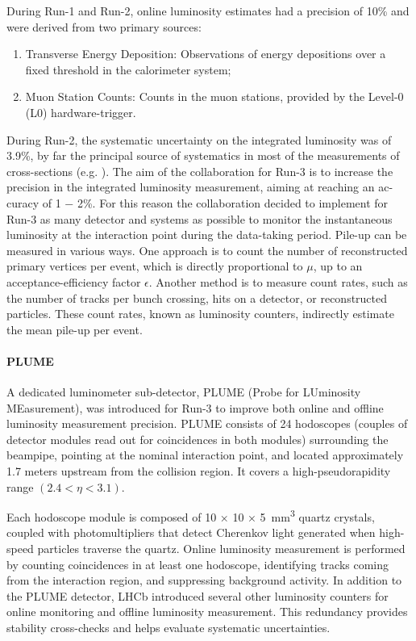 During Run-1 and Run-2, online luminosity estimates had a precision of 10\% and were derived from two primary sources: 
\begin{enumerate}
    \item Transverse Energy Deposition: Observations of energy depositions over a fixed threshold in the calorimeter system;
    \item Muon Station Counts: Counts in the muon stations, provided by the Level-0 (L0) hardware-trigger.
\end{enumerate}
During Run-2, the systematic uncertainty on the integrated luminosity was of 3.9\%, by far the principal source of systematics in most of the measurements of cross-sections (e.g. \cite{j-psi}). The aim of the collaboration for Run-3 is to increase the precision in the integrated luminosity measurement, aiming at reaching an ac- curacy of 1 − 2\%\cite{Aaij:1951625}. For this reason the collaboration decided to implement for Run-3 as many detector and systems as possible to monitor the instantaneous luminosity at the interaction point during the data-taking period.
Pile-up can be measured in various ways. One approach is to count the number of reconstructed primary vertices per event, which is directly proportional to $\mu$, up to an acceptance-efficiency factor $\epsilon$. Another method is to measure count rates, such as the number of tracks per bunch crossing, hits on a detector, or reconstructed particles. These count rates, known as luminosity counters, indirectly estimate the mean pile-up per event.

\paragraph{PLUME}
A dedicated luminometer sub-detector, PLUME (Probe for LUminosity MEasurement), was introduced for Run-3 to improve both online and offline luminosity measurement precision. PLUME consists of 24 hodoscopes (couples of detector modules read out for coincidences in both modules) surrounding the beampipe, pointing at the nominal interaction point, and located approximately 1.7 meters upstream from the collision region. It covers a high-pseudorapidity range $(2.4 < \eta < 3.1)$.

Each hodoscope module is composed of 10 × 10 × \SI{5}{\milli\meter\tothe{3}} quartz crystals, coupled with photomultipliers that detect Cherenkov light generated when high-speed particles traverse the quartz. Online luminosity measurement is performed by counting coincidences in at least one hodoscope, identifying tracks coming from the interaction region, and suppressing background activity.
In addition to the PLUME detector, LHCb introduced several other luminosity counters for online monitoring and offline luminosity measurement. This redundancy provides stability cross-checks and helps evaluate systematic uncertainties.

